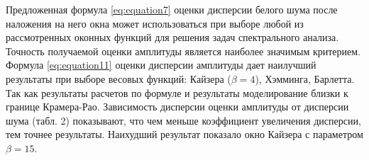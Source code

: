 Предложенная формула \ref{eq:equation7} оценки дисперсии белого шума после наложения на него окна \cite{altman2020boundary} может использоваться при выборе любой из рассмотренных оконных функций для решения задач спектрального анализа. Точность получаемой оценки амплитуды является наиболее значимым критерием.
Формула \ref{eq:equation11} оценки дисперсии амплитуды \cite{altman2020boundary} дает наилучший результаты при выборе весовых функций: Кайзера ($\beta=4$), Хэмминга, Барлетта. Так как результаты расчетов по формуле и результаты моделирование близки к границе Крамера-Рао. Зависимость дисперсии оценки амплитуды от дисперсии шума (табл. 2) показывают, что чем меньше коэффициент увеличения дисперсии, тем точнее результаты. Наихудший результат показало окно Кайзера с параметром $\beta=15$.









